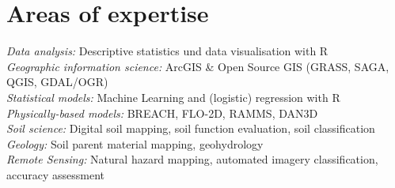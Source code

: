 \documentclass[a4paper]{twentysecondcv} %
\begin{document}

\aboutme{} %







\makeprofile %




\section{Areas of expertise}

\emph{Data analysis:} Descriptive statistics und data visualisation with R\\[0.3em]
\emph{Geographic information science:} ArcGIS \& Open Source GIS (GRASS, SAGA, \hspace*{14.5em} QGIS, GDAL/OGR)\\[0.3em]
\emph{Statistical models:} Machine Learning and (logistic) regression with R\\[0.3em]
\emph{Physically-based models:}         BREACH, FLO-2D, RAMMS, DAN3D\\[0.3em]
\emph{Soil science:} Digital soil mapping, soil function evaluation,  soil classification\\[0.3em]
\emph{Geology:} Soil parent material mapping, geohydrology\\[0.3em]
\emph{Remote Sensing:} Natural hazard mapping, automated imagery classification, \\
\hspace*{7.5em} accuracy assessment
\end{document}
